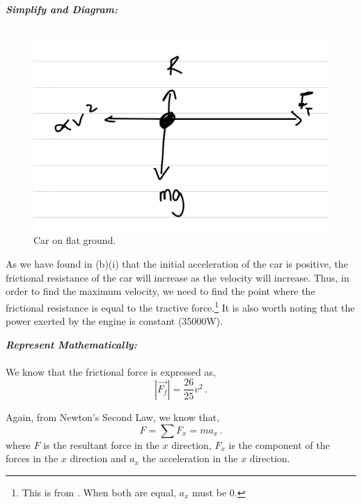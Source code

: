 \begin{subquestions}
\begin{subsubquestions}
\textbf{\textit{Simplify and Diagram:}} \\ \\
\begin{figure}[H]
	\begin{center}
		\includegraphics[scale=0.25]{../2009/figures/2009q5-2}
		\caption{\label{2009:q5:Diagram3} Car on flat ground.}
	\end{center}
\end{figure}	
As we have found in (b)(i) that the initial acceleration of the car is positive, the frictional resistance of the car will increase as the velocity will increase. Thus, in order to find the maximum velocity, we need to find the point where the frictional resistance is equal to the tractive force.\footnote{This is from . When both are equal, $a_x$ must be 0.} It is also worth noting that the power exerted by the engine is constant (35000W).




\textbf{\textit{Represent Mathematically:}} \\ \\
We know that the frictional force is expressed as,
\begin{equation}
	|\vec{F_f}| = \frac{26}{25}v^2 \,.
\end{equation}

Again, from Newton's Second Law, we know that,
\begin{equation}
	F = \sum F_x = ma_x \label{2009:q5:FxEqn3} \,.
\end{equation}
where $F$ is the resultant force in the $x$ direction, $F_x$ is the component of the forces in the $x$ direction and $a_x$ the acceleration in the $x$ direction.


\end{subsubquestions}
\end{subquestions}

